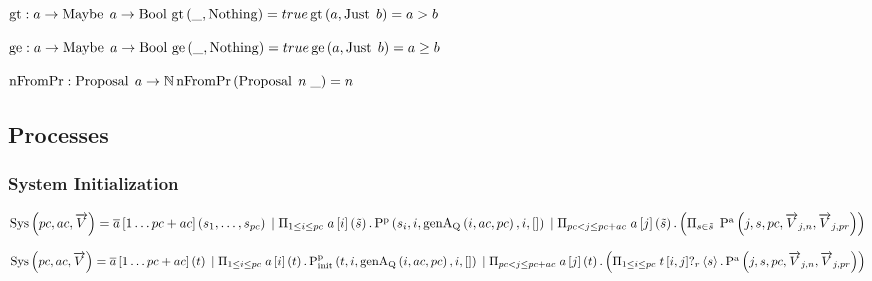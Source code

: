 $\operatorname{gt}: a \to \operatorname{Maybe}\; a \to \operatorname{Bool}\\
\operatorname{gt}\left(\_, \operatorname{Nothing}\right) = true\\
\operatorname{gt}\left(a, \operatorname{Just}\; b\right) = a > b$

$\operatorname{ge}: a \to \operatorname{Maybe}\; a \to \operatorname{Bool}\\
\operatorname{ge}\left(\_, \operatorname{Nothing}\right) = true\\
\operatorname{ge}\left(a, \operatorname{Just}\; b\right) = a \ge b$

$\operatorname{nFromPr} : \operatorname{Proposal}\; a \to \mathbb{N}\\
\operatorname{nFromPr}\left(\operatorname{Proposal}\; n\; \_ \right) = n$

\subsection{Processes}
\newcommand{\Sys}[3]{\operatorname{Sys}\left(#1, #2, #3\right)}
\newcommand{\Pp}[5]{\operatorname{P^p}\left(#1, #2, #3, #4, #5\right)}
\newcommand{\Pa}[5]{\operatorname{P^a}\left(#1, #2, #3, #4, #5\right)}
\newcommand{\Ppinit}[5]{\operatorname{P^p_{init}}\left(#1, #2, #3, #4, #5\right)}
\newcommand{\PaTwo}[0]{\operatorname{P^a_2}}

\subsubsection{System Initialization}
\newcommand{\genAq}[3]{\operatorname{genA_Q}\left(#1, #2, #3\right)}
\newcommand{\sendinitp}[3]{\overline{#1}\left[#2\right]\left(#3\right)}
\newcommand{\recvinitp}[3]{#1\left[#2\right]\left(#3\right)}
\newcommand{\parallelfor}[1]{\Pi_{#1}\;}
\newcommand{\sendsession}[2]{#1!\left\langle\left\langle #2 \right\rangle\right\rangle}
\newcommand{\recvsession}[2]{#1?\left(\left( #2 \right)\right)}
\newcommand{\rsendp}[4]{#1\left[#2, #3\right]!_r \left\langle #4 \right\rangle}
\newcommand{\rrecvp}[4]{#1\left[#2, #3\right]?_r \left\langle #4 \right\rangle}

$\Sys{pc}{ac}{\overrightarrow{V}} = \sendinitp{a}{1 \dots pc + ac}{s_1, \dots , s_{pc}}\\
\Or \parallelfor{1 \le i \le pc} \recvinitp{a}{i}{\tilde{s}} . \Pp{s_i}{i}{\genAq{i}{ac}{pc}}{i}{[]}\\
\Or \parallelfor{pc < j \le pc + ac} \recvinitp{a}{j}{\tilde{s}} .
\left( \parallelfor{s \in \tilde{s}} \Pa{j}{s}{pc}{\overrightarrow{V}_{j,n}}{\overrightarrow{V}_{j,pr}} \right)$

$\Sys{pc}{ac}{\overrightarrow{V}} = \sendinitp{a}{1 \dots pc + ac}{t}\\
\Or \parallelfor{1 \le i \le pc} \recvinitp{a}{i}{t} . \Ppinit{t}{i}{\genAq{i}{ac}{pc}}{i}{[]}\\
\Or \parallelfor{pc < j \le pc + ac} \recvinitp{a}{j}{t} . \left( \parallelfor{1 \le i \le pc} \rrecvp{t}{i}{j}{s} . \Pa{j}{s}{pc}{\overrightarrow{V}_{j,n}}{\overrightarrow{V}_{j,pr}} \right)$

